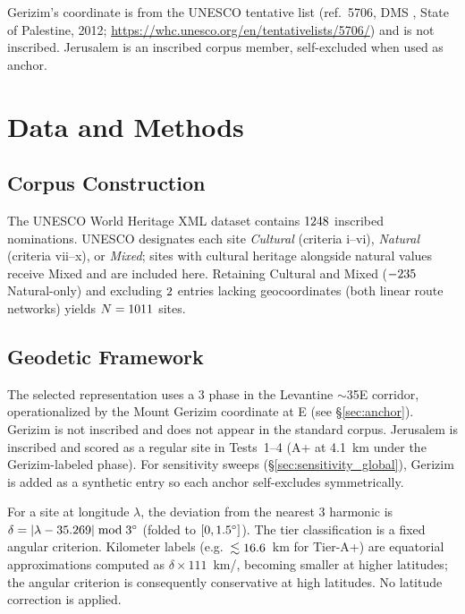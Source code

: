 Gerizim's coordinate is from the UNESCO tentative list (ref.~5706, DMS
\GerizimLonDMS{}, State of Palestine, 2012;
\url{https://whc.unesco.org/en/tentativelists/5706/}) and is not
inscribed. Jerusalem is an inscribed corpus member, self-excluded when
used as anchor.


\section{Data and Methods}
\label{sec:methods}

\subsection{Corpus Construction}
\label{sec:corpus}

The UNESCO World Heritage XML dataset \citep{unescowhc2024xml} contains
$1248$ inscribed nominations. UNESCO designates each site
\textit{Cultural} (criteria i--vi), \textit{Natural} (criteria vii--x),
or \textit{Mixed}; sites with cultural heritage alongside natural values
receive Mixed and are included here.
Retaining Cultural and Mixed ($-235$ Natural-only) and
excluding $2$ entries lacking geocoordinates (both linear
route networks) yields $N = 1011$ sites.

\subsection{Geodetic Framework}
\label{sec:geodetic}

The selected representation uses a 3\textdegree{} phase in the
Levantine $\sim$35\textdegree{}E corridor, operationalized by the Mount
Gerizim coordinate at \GerizimLon\textdegree{}E (see
\S\ref{sec:anchor}). Gerizim is not inscribed and does not appear in
the standard corpus. Jerusalem is inscribed and scored as a regular
site in Tests~1--4 (A+ at 4.1~km under the Gerizim-labeled phase).
For sensitivity sweeps (\S\ref{sec:sensitivity_global}), Gerizim is
added as a synthetic entry so each anchor self-excludes symmetrically.

For a site at longitude $\lambda$, the deviation from the nearest 3\textdegree{} harmonic is
$\delta = |\lambda - \GerizimLon| \bmod 3\textdegree{}$ (folded to $[0, 1.5\textdegree{}]$).
The tier classification is a fixed angular criterion.
Kilometer labels (e.g.\ $\lesssim16.6{}$~km for Tier-A+) are equatorial
approximations computed as $\delta \times 111$~km/\textdegree{},
becoming smaller at higher latitudes; the angular criterion is consequently
conservative at high latitudes. No latitude correction is applied.

